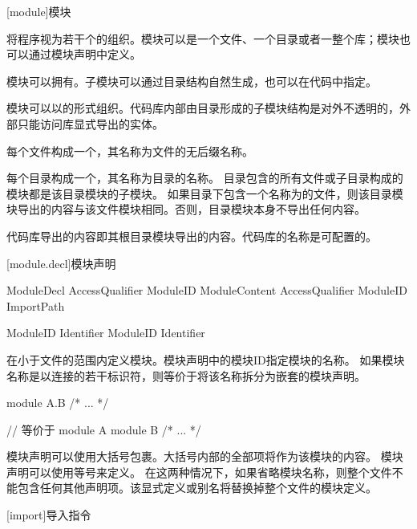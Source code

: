 
[module]{模块}

\pnum
\X{}将程序视为若干个的组织。模块可以是一个文件、一个目录或者一整个库；模块也可以通过模块声明中定义。

\pnum
模块可以拥有。子模块可以通过目录结构自然生成，也可以在代码中指定。

\pnum
模块可以以的形式组织。代码库内部由目录形成的子模块结构是对外不透明的，外部只能访问库显式导出的实体。

\pnum
每个文件构成一个，其名称为文件的无后缀名称。

\pnum
每个目录构成一个，其名称为目录的名称。
目录包含的所有文件或子目录构成的模块都是该目录模块的子模块。
如果目录下包含一个名称为的文件，则该目录模块导出的内容与该文件模块相同。否则，目录模块本身不导出任何内容。

\pnum
代码库导出的内容即其根目录模块导出的内容。代码库的名称是可配置的。

[module.decl]{模块声明}

\begin{bnf}{ModuleDecl}
    AccessQualifier\bnfq {} ModuleID\bnfq \terminal{\{} ModuleContent \terminal{\}} \br
    AccessQualifier\bnfq {} ModuleID\bnfq \terminal{=} ImportPath \terminal{;}
\end{bnf}

\begin{bnf}{ModuleID}
    Identifier \br
    ModuleID  Identifier
\end{bnf}

\pnum
{}在小于文件的范围内定义模块。模块声明中的模块ID指定模块的名称。
如果模块名称是以连接的若干标识符，则等价于将该名称拆分为嵌套的模块声明。

\enterexample
\begin{codeblock}

module A.B { /* ... */ }

// 等价于
module A { module B { /* ... */} }

\end{codeblock}
\exitexample

\pnum
模块声明可以使用大括号包裹。大括号内部的全部项将作为该模块的内容。
模块声明可以使用等号来定义。
在这两种情况下，如果省略模块名称，则整个文件不能包含任何其他声明项。该显式定义或别名将替换掉整个文件的模块定义。

[import]{导入指令}

